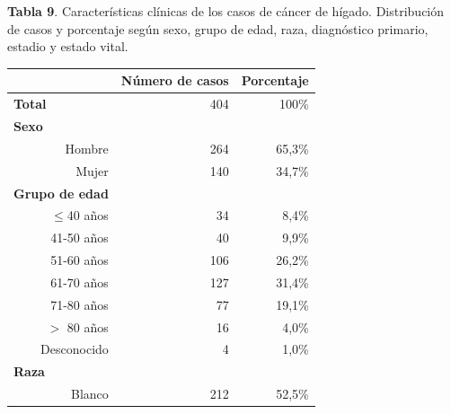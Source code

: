 \newpage
\textbf{Tabla 9}. Características clínicas de los casos de cáncer de hígado. Distribución de casos y porcentaje según sexo, grupo de edad, raza, diagnóstico primario, estadio y estado vital.
\begin{table}[H]
	\centering \small
	\begin{tabular}{rrr}
		\hline
		\multicolumn{1}{l}{}                              & \textbf{Número de casos} & \textbf{Porcentaje}       \\ \hline
		\multicolumn{1}{l}{\textbf{Total}}                & 404                      & \multicolumn{1}{r}{100\%} \\ \hline
		\multicolumn{1}{l}{\textbf{Sexo}}                 &                          & \multicolumn{1}{l}{}      \\
		Hombre                                            & 264                      & 65,3\%                    \\
		Mujer                                             & 140                      & 34,7\%                    \\ \hline
		\multicolumn{1}{l}{\textbf{Grupo de edad}}        &                          &                           \\
		$\leq$40 años                                         & 34                       & 8,4\%                     \\
		41-50 años                                        & 40                       & 9,9\%                     \\
		51-60 años                                        & 106                      & 26,2\%                    \\
		61-70 años                                        & 127                      & 31,4\%                    \\
		71-80 años                                        & 77                       & 19,1\%                    \\
		$>$ 80 años                                     & 16                       & 4,0\%                       \\
		Desconocido                                       & 4                        & 1,0\%                       \\ \hline
		\multicolumn{1}{l}{\textbf{Raza}}                 &                          &                           \\
		Blanco                                            & 212                      & 52,5\%                    \\

\end{tabular}
\end{table}
